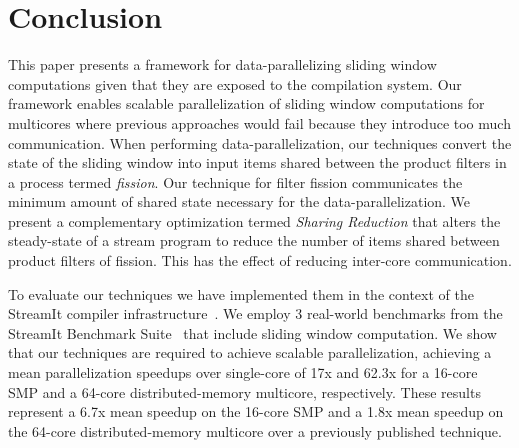 \section{Conclusion}


This paper presents a framework for data-parallelizing sliding window
computations given that they are exposed to the compilation system.  Our
framework enables scalable parallelization of sliding window
computations for multicores where previous approaches would fail
because they introduce too much communication.  When performing
data-parallelization, our techniques convert the state of the sliding
window into input items shared between the product filters in a
process termed {\it fission}.  Our technique for filter fission
communicates the minimum amount of shared state necessary for the
data-parallelization.  We present a complementary optimization termed
{\it Sharing Reduction} that alters the steady-state of a stream
program to reduce the number of items shared between product filters
of fission.  This has the effect of reducing inter-core communication.

To evaluate our techniques we have implemented them in the context of
the StreamIt compiler infrastructure~\cite{gordon-asplos06}.  We
employ 3 real-world benchmarks from the StreamIt Benchmark
Suite~\cite{streamit-suite} that include sliding window computation.
We show that our techniques are required to achieve scalable
parallelization, achieving a mean parallelization speedups over
single-core of 17x and 62.3x for a 16-core SMP and a 64-core
distributed-memory multicore, respectively.  These results represent a
6.7x mean speedup on the 16-core SMP and a 1.8x mean speedup on the
64-core distributed-memory multicore over a previously published
technique.



